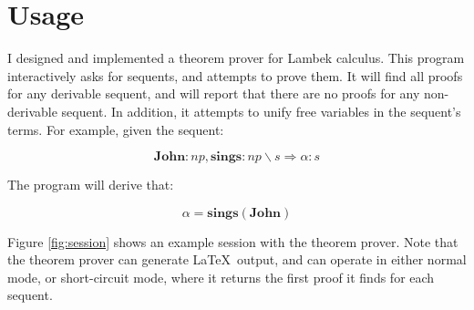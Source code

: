 \documentclass[11pt]{article}
\begin{document}
\section{Usage}
%
%

I designed and implemented a theorem prover for Lambek calculus.  This 
program interactively asks for sequents, and attempts to prove them.
It will find all proofs for any derivable sequent, and will report
that there are no proofs for any non-derivable sequent.  In addition,
it attempts to unify free variables in the sequent's terms.  For
example, given the sequent:

$$\textbf{John}:np, \textbf{sings}:np\backslash s \Rightarrow \alpha: s$$

\noindent
The program will derive that:

$$\alpha = \textbf{sings}(\textbf{John})$$

Figure \ref{fig:session} shows an example session with the theorem
prover.  Note that the theorem prover can generate \LaTeX\, output, and
can operate in either normal mode, or short-circuit mode, where it
returns the first proof it finds for each sequent.
\end{document}
